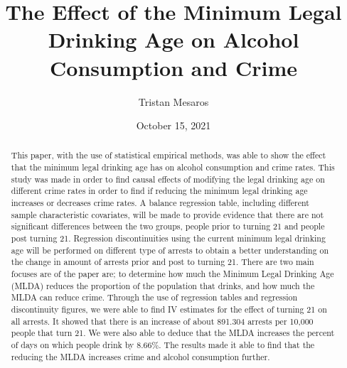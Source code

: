 \documentclass[a4paper]{article}
\title{The Effect of the Minimum Legal Drinking Age on Alcohol Consumption and Crime}
\author{Tristan Mesaros}
\affil{University of California, Santa Cruz}
\affil{Department of Economics}
\date{October 15, 2021}
\begin{document}
\maketitle

\begin{singlespace}
\begin{abstract}


This paper, with the use of statistical empirical methods, was able to show the effect that the minimum legal drinking age has on alcohol consumption and crime rates. This study was made in order to find causal effects of modifying the legal drinking age on different crime rates in order to find if reducing the minimum legal drinking age increases or decreases crime rates. A balance regression table, including different sample characteristic covariates, will be made to provide evidence that there are not significant differences between the two groups, people prior to turning 21 and people post turning 21. Regression discontinuities using the current minimum legal drinking age will be performed on different type of arrests to obtain a better understanding on the change in amount of arrests prior and post to turning 21. There are two main focuses are of the paper are; to determine how much the Minimum Legal Drinking Age (MLDA) reduces the proportion of the population that drinks, and how much the MLDA can reduce crime. Through the use of regression tables and regression discontinuity figures, we were able to find IV estimates for the effect of turning 21 on all arrests. It showed that there is an increase of about 891.304 arrests per 10,000 people that turn 21. We were also able to deduce that the MLDA increases the percent of days on which people drink by 8.66\%. The results made it able to find that the reducing the MLDA increases crime and alcohol consumption further. 

\end{abstract}
\end{singlespace}

\newpage
\end{document}
